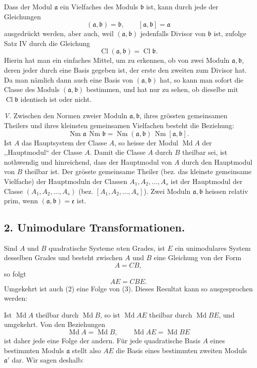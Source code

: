 \documentclass[11pt,a4paper]{article}
\newcommand{\Cl}{\operatorname{Cl}}
\newcommand{\Md}{\operatorname{Md}}
\newcommand{\Nm}{\operatorname{Nm}}
\begin{document}
Dass der Modul $\mathfrak a$ ein Vielfaches des Moduls $\mathfrak b$ ist, kann durch jede der Gleichungen
\[
 (\mathfrak a,\mathfrak b)=\mathfrak b,
 \qquad
 [\mathfrak a,\mathfrak b]=\mathfrak a
\]
ausgedrückt werden, aber auch, weil $(\mathfrak a,\mathfrak b)$ jedenfalls Divisor von $\mathfrak b$ ist, zufolge Satz IV durch die Gleichung
\[
 \Cl(\mathfrak a,\mathfrak b)=\Cl\mathfrak b.
\]
Hierin hat man ein einfaches Mittel, um zu erkennen, ob von zwei Moduln $\mathfrak a,\mathfrak b$, deren jeder durch eine Basis gegeben ist, der erste den zweiten zum Divisor hat. Da man nämlich dann auch eine Basis von $(\mathfrak a,\mathfrak b)$ hat, so kann man sofort die Classe des Moduls $(\mathfrak a,\mathfrak b)$ bestimmen, und hat nur zu sehen, ob dieselbe mit $\Cl\mathfrak b$ identisch ist oder nicht.

\emph{V.} Zwischen den Normen zweier Moduln $\mathfrak a,\mathfrak b$, ihres grössten gemeinsamen Theilers und ihres kleinsten gemeinsamen Vielfachen besteht die Beziehung:
\[
 \Nm\mathfrak a\,\Nm\mathfrak b
 =\Nm(\mathfrak a,\mathfrak b)\,\Nm[\mathfrak a,\mathfrak b].
\]
Ist $A$ das Hauptsystem der Classe $A$, so heisse der Modul $\Md A$ der ,,Hauptmodul`` der Classe $A$. Damit die Classe $A$ durch $B$ theilbar sei, ist nothwendig und hinreichend, dass der Hauptmodul von $A$ durch den Hauptmodul von $B$ theilbar ist. Der grösste gemeinsame Theiler (bez. das kleinste gemeinsame Vielfache) der Hauptmoduln der Classen $A_1,A_2,\ldots,A_s$ ist der Hauptmodul der Classe $(A_1,A_2,\ldots,A_s)$ (bez. $[A_1,A_2,\ldots,A_s]$). Zwei Moduln $\mathfrak a,\mathfrak b$ heissen relativ prim, wenn $(\mathfrak a,\mathfrak b)=\mathfrak e$ ist.

\subsection*{2. Unimodulare Transformationen.}

Sind $A$ und $B$ quadratische Systeme $n$ten Grades, ist $E$ ein unimodulares System desselben Grades und besteht zwischen $A$ und $B$ eine Gleichung von der Form
\begin{equation}
 A=CB,
\tag{2}
\end{equation}
so folgt
\begin{equation}
 AE=CBE.
\tag{3}
\end{equation}
Umgekehrt ist auch (2) eine Folge von (3). Dieses Resultat kann so ausgesprochen werden:

Ist $\Md A$ theilbar durch $\Md B$, so ist $\Md AE$ theilbar durch $\Md BE$, und umgekehrt. Von den Beziehungen
\begin{equation}
 \Md A=\Md B,
 \qquad
 \Md AE=\Md BE
\tag{4}
\end{equation}
ist daher jede eine Folge der andern. Für jede quadratische Basis $A$ eines bestimmten Moduls $\mathfrak a$ stellt also $AE$ die Basis eines bestimmten zweiten Moduls $\mathfrak a'$ dar. Wir sagen deshalb:
\end{document}
